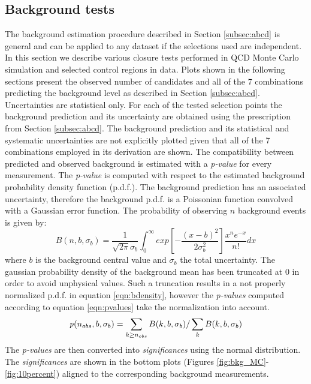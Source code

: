 \subsection{Background tests}
\label{subsec:backgroundtests}
The background estimation procedure described in Section \ref{subsec:abcd} is general and can be applied
to any dataset if the selections used are independent.
In this section we describe various closure tests performed in QCD Monte Carlo simulation and 
selected control regions in data. Plots shown in the following sections present the observed number
of candidates and all of the 7 combinations predicting the background level as described
 in Section \ref{subsec:abcd}.
Uncertainties are statistical only. For each of the tested selection points the background prediction 
and its uncertainty are obtained 
using the prescription from Section \ref{subsec:abcd}. The background prediction and its statistical 
and systematic uncertainties are
 not explicitly plotted given that all of the 7 combinations employed in its derivation are shown.  
The compatibility between predicted and observed background is estimated with a {\it p-value} for every measurement. 
 The {\it p-value}
is computed with respect to the estimated background probability density function (p.d.f.). 
The background prediction has an associated uncertainty, 
therefore the background p.d.f. is a Poissonian function convolved  
with a Gaussian error function. The probability of observing $n$ background events is given by:
\begin{equation}
B(n,b,\sigma_b)= \frac{1}{\sqrt{2\pi}\sigma_b} \int_{0}^{\infty} 
exp\left[ -\frac{\left(x-b\right)^2}{2\sigma_b^2}\right]\frac{x^n e^{-x}}{n!}dx
\label{eqn:bdensity}
\end{equation}
where $b$ is the background central value and $\sigma_b$ the total uncertainty.
The gaussian probability density of the background mean has been truncated at 
0 in order to avoid unphysical values. Such a truncation results in a not properly normalized p.d.f. in equation 
\ref{eqn:bdensity}, however the {\it p-values} computed according to equation \ref{eqn:pvalues} take the 
normalization into account.   
\begin{equation}
{\it p} (n_{obs},b,\sigma_b) = \sum_{k\geq n_{obs}} B(k,b,\sigma_b) / \sum_{k} B(k,b,\sigma_b)
\label{eqn:pvalues}
\end{equation}
The {\it p-values} are then converted into {\it significances} using the normal
 distribution. The {\it significances} are shown in the bottom plots (Figures 
\ref{fig:bkg_MC}-\ref{fig:10percent}) aligned to the corresponding background
measurements.  

